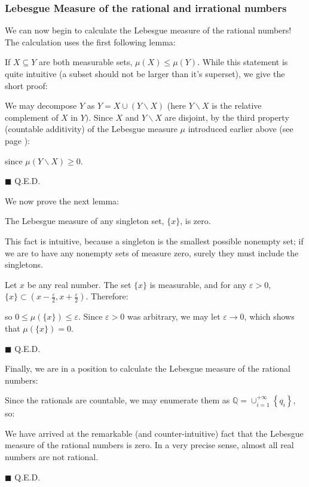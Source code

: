 	\subsubsection{Lebesgue Measure of the rational and irrational numbers}
	We can now begin to calculate the Lebesgue measure of the rational numbers! The calculation uses the first following lemma: 
	\begin{lemma}
	If $X \subseteq Y$ are both measurable sets, $\mu(X) \leq \mu(Y)$. While this statement is quite intuitive (a subset should not be larger than it's superset), we give the short proof:
	\end{lemma}	
	\begin{dem}
	We may decompose $Y$ as	$Y=X \cup(Y \backslash X)$ (here $Y \backslash X$ is the relative complement of $X$ in $Y)$. Since $X$ and $Y \backslash X$ are disjoint, by the third property (countable additivity) of the Lebesgue measure $\mu$ introduced earlier above (see page \pageref{measure}):
	
	since $\mu(Y \backslash X) \geq 0$.
	\begin{flushright}
		$\blacksquare$  Q.E.D.
	\end{flushright}
	\end{dem}
	We now prove the next lemma:
	\begin{lemma}
	The Lebesgue measure of any singleton set, $\{x\}$, is zero. 
	\end{lemma}	
	\begin{dem}
	This fact is intuitive, because a singleton is the smallest possible nonempty set; if we are to have any nonempty sets of measure zero, surely they must include the singletons. 
	
	Let $x$ be any real number. The set $\{x\}$ is measurable, and for any $\varepsilon>0$, $\{x\} \subset\left(x-\frac{\varepsilon}{2}, x+\frac{\varepsilon}{2}\right)$. Therefore:
	
	so $0 \leq \mu(\{x\}) \leq \varepsilon$. Since $\varepsilon>0$ was arbitrary, we may let $\varepsilon \rightarrow 0$, which shows that $\mu(\{x\})=0$.
	\begin{flushright}
		$\blacksquare$  Q.E.D.
	\end{flushright}
	\end{dem}	
	Finally, we are in a position to calculate the Lebesgue measure of the rational numbers:
	\begin{dem}
	Since the rationals are countable, we may enumerate them as $\mathbb{Q}=\cup_{i=1}^{+\infty}\left\{q_{i}\right\}$, so:
	
	We have arrived at the remarkable (and counter-intuitive) fact that the Lebesgue measure of the rational numbers is zero. In a very precise sense, almost all real numbers are not rational.
	\begin{flushright}
		$\blacksquare$  Q.E.D.
	\end{flushright}
	\end{dem}
